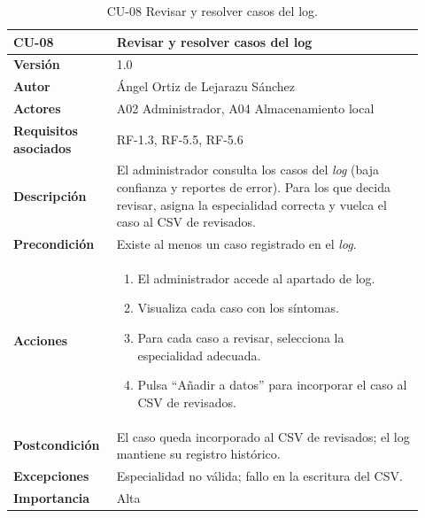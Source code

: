\begin{table}[H]
	\centering
	\begin{tabular}{ p{0.21\linewidth} p{0.71\linewidth} }
		\toprule
		\textbf{CU-08}    & \textbf{Revisar y resolver casos del log}\\
		\toprule
		\textbf{Versión}              & 1.0 \\
		\textbf{Autor}                & Ángel Ortiz de Lejarazu Sánchez \\
		\textbf{Actores}              & A02 Administrador, A04 Almacenamiento local \\
		\textbf{Requisitos asociados} & RF-1.3, RF-5.5, RF-5.6 \\
		\textbf{Descripción}          & El administrador consulta los casos del \textit{log} (baja confianza y reportes de error). Para los que decida revisar, asigna la especialidad correcta y vuelca el caso al CSV de revisados. \\
		\textbf{Precondición}         & Existe al menos un caso registrado en el \textit{log}. \\
		\textbf{Acciones}             &
		\begin{enumerate}
			\def\labelenumi{\arabic{enumi}.}
			\item El administrador accede al apartado de log.
			\item Visualiza cada caso con los síntomas.
			\item Para cada caso a revisar, selecciona la especialidad adecuada.
			\item Pulsa ``Añadir a datos'' para incorporar el caso al CSV de revisados.
		\end{enumerate} \\
		\textbf{Postcondición}        & El caso queda incorporado al CSV de revisados; el log mantiene su registro histórico. \\
		\textbf{Excepciones}          & Especialidad no válida; fallo en la escritura del CSV. \\
		\textbf{Importancia}          & Alta \\
		\bottomrule
	\end{tabular}
	\caption{CU-08 Revisar y resolver casos del log.}
\end{table}

